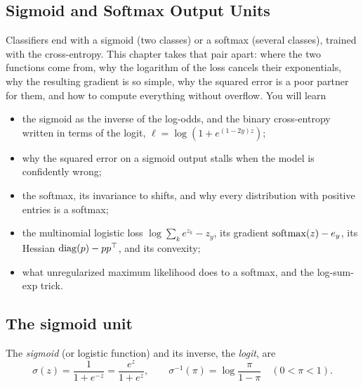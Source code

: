 \begin{notechapter}
\chapter{Sigmoid and Softmax Output Units}\label{ch:sigmoid-softmax}

\begin{chapterintro}
Classifiers end with a sigmoid (two classes) or a softmax (several classes),
trained with the cross-entropy. This chapter takes that pair apart: where the
two functions come from, why the logarithm of the loss cancels their
exponentials, why the resulting gradient is so simple, why the squared error is
a poor partner for them, and how to compute everything without overflow. You
will learn
\begin{itemize}[nosep]
  \item the sigmoid as the inverse of the log-odds, and the binary cross-entropy
        written in terms of the logit, $\ell = \log(1 + e^{(1-2y)z})$;
  \item why the squared error on a sigmoid output stalls when the model is
        confidently wrong;
  \item the softmax, its invariance to shifts, and why every distribution with
        positive entries is a softmax;
  \item the multinomial logistic loss $\log\sum_ke^{z_k} - z_y$, its gradient
        $\operatorname{softmax}(z) - e_y$, its Hessian $\operatorname{diag}(p) - pp^\top$, and its convexity;
  \item what unregularized maximum likelihood does to a softmax, and the
        log-sum-exp trick.
\end{itemize}
\end{chapterintro}

\section{The sigmoid unit}\label{sigmoid-softmax:sec:sigmoid}

\begin{definition}
The \emph{sigmoid} (or logistic function) and its inverse, the \emph{logit}, are
\[
  \sigma(z) = \frac1{1 + e^{-z}} = \frac{e^z}{1 + e^z},\qquad
  \sigma^{-1}(\pi) = \log\frac\pi{1 - \pi}\quad(0<\pi<1).
\]
\end{definition}


\end{notechapter}
